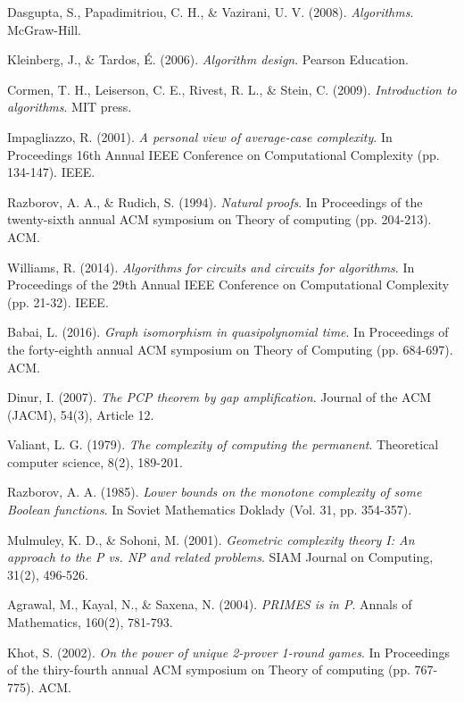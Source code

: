\documentclass[a4paper,12pt]{ctexart}
\begin{document}
\begin{thebibliography}{99}
Dasgupta, S., Papadimitriou, C. H., \& Vazirani, U. V. (2008).
\textit{Algorithms}.
McGraw-Hill.

Kleinberg, J., \& Tardos, É. (2006).
\textit{Algorithm design}.
Pearson Education.

Cormen, T. H., Leiserson, C. E., Rivest, R. L., \& Stein, C. (2009).
\textit{Introduction to algorithms}.
MIT press.

Impagliazzo, R. (2001).
\textit{A personal view of average-case complexity}.
In Proceedings 16th Annual IEEE Conference on Computational Complexity (pp. 134-147).
IEEE.

Razborov, A. A., \& Rudich, S. (1994).
\textit{Natural proofs}.
In Proceedings of the twenty-sixth annual ACM symposium on Theory of computing (pp. 204-213).
ACM.

Williams, R. (2014).
\textit{Algorithms for circuits and circuits for algorithms}.
In Proceedings of the 29th Annual IEEE Conference on Computational Complexity (pp. 21-32).
IEEE.

Babai, L. (2016).
\textit{Graph isomorphism in quasipolynomial time}.
In Proceedings of the forty-eighth annual ACM symposium on Theory of Computing (pp. 684-697).
ACM.

Dinur, I. (2007).
\textit{The PCP theorem by gap amplification}.
Journal of the ACM (JACM), 54(3), Article 12.

Valiant, L. G. (1979).
\textit{The complexity of computing the permanent}.
Theoretical computer science, 8(2), 189-201.

Razborov, A. A. (1985).
\textit{Lower bounds on the monotone complexity of some Boolean functions}.
In Soviet Mathematics Doklady (Vol. 31, pp. 354-357).

Mulmuley, K. D., \& Sohoni, M. (2001).
\textit{Geometric complexity theory I: An approach to the P vs. NP and related problems}.
SIAM Journal on Computing, 31(2), 496-526.

Agrawal, M., Kayal, N., \& Saxena, N. (2004).
\textit{PRIMES is in P}.
Annals of Mathematics, 160(2), 781-793.

Khot, S. (2002).
\textit{On the power of unique 2-prover 1-round games}.
In Proceedings of the thiry-fourth annual ACM symposium on Theory of computing (pp. 767-775).
ACM.

\end{thebibliography}
\end{document}
